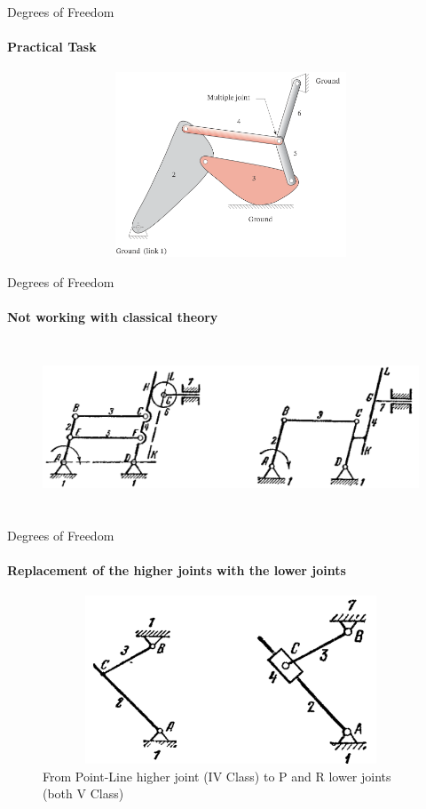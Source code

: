 \documentclass[aspectratio=169]{beamer}
\begin{document}
\begin{frame}[t]{Degrees of Freedom}
\framesubtitle{Practical Task}
\vspace{-0.7cm}
\begin{figure}[H]
    \centering\includegraphics[height=5.5cm,width=1\textwidth,keepaspectratio]{stud_task.png}
    \caption*{}
    \label{fig:stud_task.png}
\end{figure}        
\end{frame}


\begin{frame}[t]{Degrees of Freedom}
\framesubtitle{Not working with classical theory}
\vspace{-0.5cm}
    \begin{figure}[H]
        \centering\includegraphics[height=5cm,width=1\textwidth,keepaspectratio]{extra_links_mech.png}
        \label{fig:extra_links_mech.png}
    \end{figure}
\end{frame}

\begin{frame}[t]{Degrees of Freedom}
\framesubtitle{Replacement of the higher joints with the lower joints}
\vspace{-0.5cm}
    \begin{figure}[H]
        \centering\includegraphics[height=5cm,width=1\textwidth,keepaspectratio]{from_h_to_l_mech.png}
        \caption*{From Point-Line higher joint (IV Class) to P and R lower joints (both V Class)}
        \label{from_h_to_l_mech.png}
    \end{figure}
\end{frame}
\end{document}
